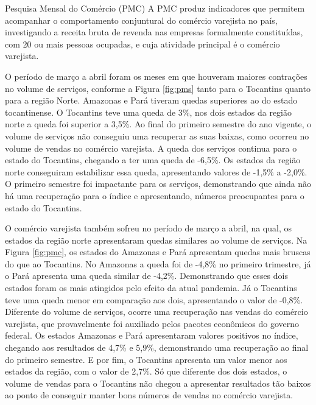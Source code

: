 \begin{smbox}[label={labelbox},nameref={Pesquisa Mensal do Comércio(PMC)}]{Pesquisa Mensal do Comércio (PMC)}
A PMC produz indicadores que permitem acompanhar o comportamento conjuntural do comércio varejista no país, investigando a receita bruta de revenda nas empresas formalmente constituídas, com 20 ou mais pessoas ocupadas, e cuja atividade principal é o comércio varejista.
\end{smbox}

\par O período de março a abril foram os meses em que houveram maiores contrações no volume de serviços, conforme a Figura \ref{fig:pms} tanto para o Tocantins quanto para a região Norte. Amazonas e Pará tiveram quedas superiores ao do estado tocantinense. O Tocantins teve uma queda de 3\%, nos dois estados da região norte a queda foi superior a 3,5\%. Ao final do primeiro semestre do ano vigente, o volume de serviços não conseguiu uma recuperar as suas baixas, como ocorreu no volume de vendas no comércio varejista. A queda dos serviços continua para o estado do Tocantins, chegando a ter uma queda de -6,5\%. Os estados da região norte conseguiram estabilizar essa queda, apresentando valores de -1,5\% a -2,0\%. O primeiro semestre foi impactante para os serviços, demonstrando que ainda não há uma recuperação para o índice e apresentando, números preocupantes para o estado do Tocantins.
\par O comércio varejista também sofreu no período de março a abril, na qual, os estados da região norte apresentaram quedas similares ao volume de serviços. Na Figura \ref{fig:pmc}, os estados do Amazonas e Pará apresentam quedas mais bruscas do que ao Tocantins. No Amazonas a queda foi de -4,8\% no primeiro trimestre, já o Pará apresenta uma queda similar de -4,2\%. Demonstrando que esses dois estados foram os mais atingidos pelo efeito da atual pandemia. Já o Tocantins teve uma queda menor em comparação aos dois, apresentando o valor de -0,8\%. Diferente do volume de serviços, ocorre uma recuperação nas vendas do comércio varejista, que provavelmente foi auxiliado pelos pacotes econômicos do governo federal. Os estados Amazonas e Pará apresentaram valores positivos no índice, chegando aos resultados de 4,7\% e 5,9\%, demonstrando uma recuperação ao final do primeiro semestre. E por fim, o Tocantins apresenta um valor menor aos estados da região, com o valor de 2,7\%. Só que diferente dos dois estados, o volume de vendas para o Tocantins não chegou a apresentar resultados tão baixos ao ponto de conseguir manter bons números de vendas no comércio varejista.
